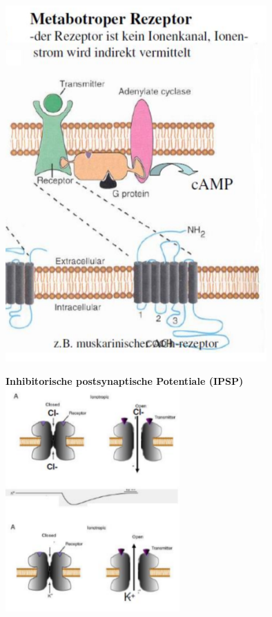 \begin{enumerate}
	\includegraphics[width=0.75\textwidth]{lectures/160405/pix/metabotrop.png}\newpage
\end{enumerate}

\textbf{Inhibitorische postsynaptische Potentiale (IPSP)}\\
\includegraphics[width=0.5\textwidth]{lectures/160405/pix/ipsp.png}

